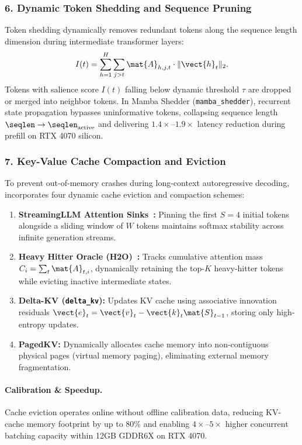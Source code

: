 \subsubsection{6. Dynamic Token Shedding and Sequence Pruning}
\label{subsubsec:token_shedding}
Token shedding dynamically removes redundant tokens along the sequence length dimension during intermediate transformer layers:
\begin{equation}
I(t) = \sum_{h=1}^H \sum_{j > t} \mat{A}_{h, j, t} \cdot \|\vect{h}_t\|_2.
\end{equation}
Tokens with salience score $I(t)$ falling below dynamic threshold $\tau$ are dropped or merged into neighbor tokens. In Mamba Shedder (\texttt{mamba\_shedder}), recurrent state propagation bypasses uninformative tokens, collapsing sequence length $\seqlen \to \seqlen_{\text{active}}$ and delivering $1.4\times\text{--}1.9\times$ latency reduction during prefill on RTX 4070 silicon.

\subsubsection{7. Key-Value Cache Compaction and Eviction}
\label{subsubsec:kv_compaction}
To prevent out-of-memory crashes during long-context autoregressive decoding, \neuralops{} incorporates four dynamic cache eviction and compaction schemes:
\begin{enumerate}
\item \textbf{StreamingLLM Attention Sinks~\cite{xiao2024streamingllm}:} Pinning the first $S=4$ initial tokens alongside a sliding window of $W$ tokens maintains softmax stability across infinite generation streams.
\item \textbf{Heavy Hitter Oracle (H2O)~\cite{zhang2024h2o}:} Tracks cumulative attention mass $C_i = \sum_{t} \mat{A}_{t, i}$, dynamically retaining the top-$K$ heavy-hitter tokens while evicting inactive intermediate states.
\item \textbf{Delta-KV (\texttt{delta\_kv}):} Updates KV cache using associative innovation residuals $\vect{e}_t = \vect{v}_t - \vect{k}_t \mat{S}_{t-1}$, storing only high-entropy updates.
\item \textbf{PagedKV:} Dynamically allocates cache memory into non-contiguous physical pages (virtual memory paging), eliminating external memory fragmentation.
\end{enumerate}

\paragraph{Calibration \& Speedup.} Cache eviction operates online without offline calibration data, reducing KV-cache memory footprint by up to $80\%$ and enabling $4\times\text{--}5\times$ higher concurrent batching capacity within 12GB GDDR6X on RTX 4070.

